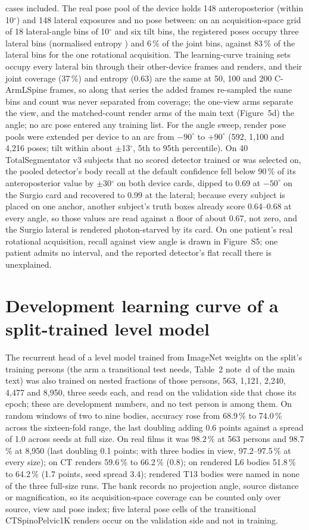 cases included. The real pose pool of the device holds 148 anteroposterior (within 10$^\circ$) and 148 lateral
exposures and no pose between: on an acquisition-space grid of 18 lateral-angle bins of 10$^\circ$ and six tilt bins,
the registered poses occupy three lateral bins (normalised entropy ) and 6\,\% of the joint bins, against 83\,\%
of the lateral bins for the one rotational acquisition. The learning-curve training sets occupy every lateral bin
through their other-device frames and renders, and their joint coverage (37\,\%) and entropy (0.63) are the same at
50, 100 and 200 C-ArmLSpine frames, so along that series the added frames re-sampled the same bins and count was
never separated from coverage; the one-view arms separate the view, and the matched-count render arms of the main
text (Figure~5d) the angle; no arc pose entered any training list. For the angle sweep, render pose pools were extended per device to an arc from
$-90^\circ$ to $+90^\circ$ (592, 1,100 and 4,216 poses; tilt within about $\pm$13$^\circ$, 5th to 95th percentile).
On 40 TotalSegmentator v3 subjects that no scored detector trained or was selected on, the pooled detector's body
recall at the default confidence fell below 90\,\% of its anteroposterior value by $\pm$30$^\circ$ on both device
cards, dipped to 0.69 at $-50^\circ$ on the Surgio card and recovered to 0.99 at the lateral; because every subject
is placed on one anchor, another subject's truth boxes already score 0.64--0.68 at every angle, so those values are
read against a floor of about 0.67, not zero, and the Surgio lateral is rendered photon-starved by its card. On one
patient's real rotational acquisition, recall against view angle is drawn in Figure~S5; one patient admits no
interval, and the reported detector's flat recall there is unexplained.

\section*{Development learning curve of a split-trained level model}
The recurrent head of a level model trained from ImageNet weights on the split's training persons (the arm a
transitional test needs, Table~2 note~d of the main text) was also trained on nested fractions of those persons, 563, 1,121, 2,240, 4,477 and 8,950, three seeds
each, and read on the validation side that chose its epoch; these are development numbers, and no test person is
among them. On random windows of two to nine bodies, accuracy rose from 68.9\,\% to 74.0\,\% across the sixteen-fold
range, the last doubling adding 0.6 points against a spread of 1.0 across seeds at full size. On real films it was
98.2\,\% at 563 persons and 98.7\,\% at 8,950 (last doubling 0.1 points; with three bodies in view, 97.2--97.5\,\% at
every size); on CT renders 59.6\,\% to 66.2\,\% (0.8); on rendered L6 bodies 51.8\,\% to 64.2\,\% (1.7 points, seed
spread 3.4); rendered T13 bodies were named in none of the three full-size runs. The bank records no projection angle, source distance or magnification, so its acquisition-space
coverage can be counted only over source, view and pose index; five lateral pose cells of the transitional
CTSpinoPelvic1K renders occur on the validation side and not in training.

